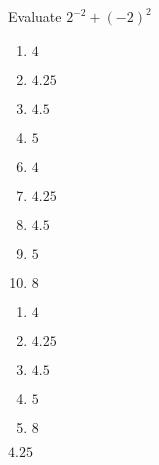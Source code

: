 
 Evaluate $2^{-2}+(-2)^{2}$


\ifsat
	\begin{enumerate}[label=\Alph*)]
		\item   $4$
		\item  $4.25$%
		\item  $4.5$
		\item  $5$
	\end{enumerate}
\else
\fi

\ifacteven
	\begin{enumerate}[label=\textbf{\Alph*.},itemsep=\fill,align=left]
		\setcounter{enumii}{5}
		\item   $4$
		\item  $4.25$%
		\item  $4.5$
		\addtocounter{enumii}{1}
		\item  $5$
		\item   $8$
	\end{enumerate}
\else
\fi

\ifactodd
	\begin{enumerate}[label=\textbf{\Alph*.},itemsep=\fill,align=left]
		\item   $4$
		\item  $4.25$%
		\item  $4.5$
		\item  $5$
		\item   $8$
	\end{enumerate}
\else
\fi

\ifgridin
  $4.25$%
		
\else
\fi

